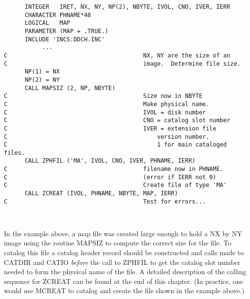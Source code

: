 \begin{verbatim}
      INTEGER   IRET, NX, NY, NP(2), NBYTE, IVOL, CNO, IVER, IERR
      CHARACTER PHNAME*48
      LOGICAL   MAP
      PARAMETER (MAP = .TRUE.)
      INCLUDE 'INCS:DDCH.INC'
           ...
C                                       NX, NY are the size of an
C                                       image.  Determine file size.
      NP(1) = NX
      NP(2) = NY
      CALL MAPSIZ (2, NP, NBYTE)
C                                       Size now in NBYTE
C                                       Make physical name.
C                                       IVOL = disk number
C                                       CNO = catalog slot number
C                                       IVER = extension file
C                                           version number.
C                                           1 for main cataloged files.
      CALL ZPHFIL ('MA', IVOL, CNO, IVER, PHNAME, IERR)
C                                       filename now in PHNAME.
C                                       (error if IERR not 0)
C                                       Create file of type 'MA'
      CALL ZCREAT (IVOL, PHNAME, NBYTE, MAP, IERR)
C                                       Test for errors...



\end{verbatim}
In the example above, a map file was created large enough to hold a NX
by NY image using the routine MAPSIZ to compute the
correct size for the file.  To catalog this file a
catalog header record should be constructed and calls made to CATDIR
and CATIO {\it before}  the call to ZPHFIL to get the catalog slot
number needed to form the physical name of the file.  A detailed
description of the calling sequence for ZCREAT can be found at the
end of this chapter. (In practice, one would use MCREAT to catalog and
create the file shown in the example above.)

